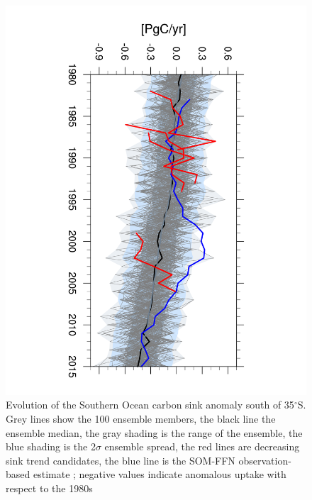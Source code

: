 \begin{figure}[bth]
        \includegraphics[scale=0.43,trim=4cm 0cm 4cm 0cm,clip,angle=90]{gfx/co2flux_SO_timeseries_ym_mar-feb_35S_1980_2015_trend_8}
        \caption{Evolution of the Southern Ocean carbon sink anomaly south of 35$^\circ$S. Grey lines show the 100 ensemble members, the black line the ensemble median, the gray shading is the range of the ensemble, the blue shading is the 2$\sigma$ ensemble spread, the red lines are decreasing sink trend candidates, the blue line is the SOM-FFN observation-based estimate \citep{landschuetzer2015}; negative values indicate anomalous uptake with respect to the 1980s}
        \label{fig:SOCS}
\end{figure}
